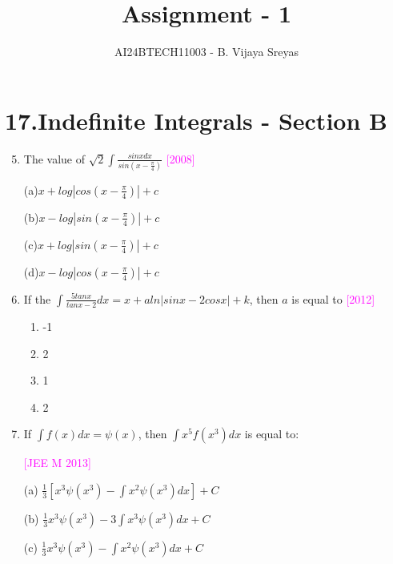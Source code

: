 \documentclass[journal,12pt,twocolumn]{IEEEtran}
\theoremstyle{remark}
\begin{document}

\vspace{3cm}

\title{Assignment - 1}
\author{AI24BTECH11003 - B. Vijaya Sreyas}
\maketitle
\newpage
\bigskip

\renewcommand{\thefigure}{\theenumi}
\renewcommand{\thetable}{\theenumi}

\large\section{\textbf{17.Indefinite Integrals - Section B}}\small

\begin{enumerate}[label=\textcolor{magenta}{\arabic*.}]
		\setcounter{enumi}{4}
	\item The value of $\sqrt{2}\int\frac{sinxdx}{sin(x-\frac{\pi}{4})}$
		\hfill{\textcolor{magenta}{[2008]}}

		(a)$x+log|cos(x-\frac{\pi}{4})|+c$

		(b)$x-log|sin(x-\frac{\pi}{4})|+c$

		(c)$x+log|sin(x-\frac{\pi}{4})|+c$

		(d)$x-log|cos(x-\frac{\pi}{4})|+c$

	\item If the $\int\frac{5tanx}{tanx-2}dx=x+aln|sinx-2cosx|+k$, then $a$ is equal to
		\hfill{\textcolor{magenta}{[2012]}}

		\begin{multicols}{4}
			\begin{enumerate}[label=(\alph*)]
				\item -1
				\item 2
				\item 1
				\item 2
			\end{enumerate}
		\end{multicols}
		
	\item If $\int f(x)dx=\psi(x)$, then $\int x^5f(x^3)dx$ is equal to:

		\hfill{\textcolor{magenta}{[JEE M 2013]}}

		(a) $\frac{1}{3}[x^3\psi(x^3)-\int x^2\psi(x^3)dx] + C$

		(b) $\frac{1}{3}x^3\psi(x^3)-3\int x^3\psi(x^3)dx + C$

		(c) $\frac{1}{3}x^3\psi(x^3)-\int x^2\psi(x^3)dx + C$


\end{enumerate}
\end{document}
